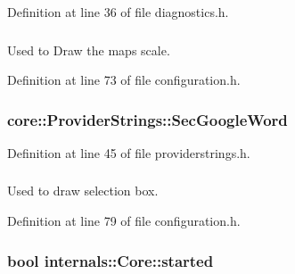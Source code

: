 \-Definition at line 36 of file diagnostics.\-h.

\hypertarget{group___o_p_map_widget_gab4e66a6217ae69c3344a0af8578f5932}{
\subsubsection[{\-Scale\-Pen}]{}}\label{group___o_p_map_widget_gab4e66a6217ae69c3344a0af8578f5932}


\-Used to \-Draw the maps scale. 



\-Definition at line 73 of file configuration.\-h.

\hypertarget{group___o_p_map_widget_gaa681a15654ccc6246baadb0d3e51e660}{
\subsubsection[{\-Sec\-Google\-Word}]{ {\bf core\-::\-Provider\-Strings\-::\-Sec\-Google\-Word}}}\label{group___o_p_map_widget_gaa681a15654ccc6246baadb0d3e51e660}


\-Definition at line 45 of file providerstrings.\-h.

\hypertarget{group___o_p_map_widget_gab3ccb3d980f16de07166bad27b8ff4dc}{
\subsubsection[{\-Selection\-Pen}]{}}\label{group___o_p_map_widget_gab3ccb3d980f16de07166bad27b8ff4dc}


\-Used to draw selection box. 



\-Definition at line 79 of file configuration.\-h.

\hypertarget{group___o_p_map_widget_ga797e80c1349c656593de207aa74935de}{
\subsubsection[{started}]{\setlength{\rightskip}{0pt plus 5cm}bool {\bf internals\-::\-Core\-::started}}}\label{group___o_p_map_widget_ga797e80c1349c656593de207aa74935de}


